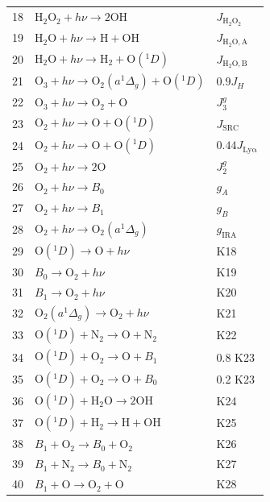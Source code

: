 \begin{longtable}{rp{}p{}}
18 & $\mathrm{H_{2}O_{2}}+h\nu\longrightarrow 2\mathrm{OH}$ & $J_{\mathrm{H_2O_2}}$\\
19 & $\mathrm{H_{2}O}+h\nu\longrightarrow \mathrm{H}+\mathrm{OH}$ & $J_{\mathrm{H_2O,A}}$\\
20 & $\mathrm{H_{2}O}+h\nu\longrightarrow \mathrm{H_{2}}+\mathrm{O}(^1D)$ & $J_{\mathrm{H_2O,B}}$\\
21 & $\mathrm{O_{3}}+h\nu\longrightarrow \mathrm{O}_2(a^1\Delta_g)+\mathrm{O}(^1D)$ & $0.9J_H$\\
22 & $\mathrm{O_{3}}+h\nu\longrightarrow \mathrm{O_{2}}+\mathrm{O}$ & $J_3^g$\\
23 & $\mathrm{O_{2}}+h\nu\longrightarrow \mathrm{O}+\mathrm{O}(^1D)$ & $J_{\mathrm{SRC}}$\\
24 & $\mathrm{O_{2}}+h\nu\longrightarrow \mathrm{O}+\mathrm{O}(^1D)$ & $0.44J_{\mathrm{Ly\alpha}}$\\
25 & $\mathrm{O_{2}}+h\nu\longrightarrow 2\mathrm{O}$ & $J_2^g$\\
26 & $\mathrm{O_{2}}+h\nu\longrightarrow B_0$ & $g_A$\\
27 & $\mathrm{O_{2}}+h\nu\longrightarrow B_1$ & $g_B$\\
28 & $\mathrm{O_{2}}+h\nu\longrightarrow \mathrm{O}_2(a^1\Delta_g)$ & $g_{\mathrm{IRA}}$\\
29 & $\mathrm{O}(^1D)\longrightarrow \mathrm{O}+h\nu$ & K18\\
30 & $B_0\longrightarrow \mathrm{O_{2}}+h\nu$ & K19\\
31 & $B_1\longrightarrow \mathrm{O_{2}}+h\nu$ & K20\\
32 & $\mathrm{O}_2(a^1\Delta_g)\longrightarrow \mathrm{O_{2}}+h\nu$ & K21\\
33 & $\mathrm{O}(^1D)+\mathrm{N_{2}}\longrightarrow \mathrm{O}+\mathrm{N_{2}}$ & K22\\
34 & $\mathrm{O}(^1D)+\mathrm{O_{2}}\longrightarrow \mathrm{O}+B_1$ & 0.8 K23\\
35 & $\mathrm{O}(^1D)+\mathrm{O_{2}}\longrightarrow \mathrm{O}+B_0$ & 0.2 K23\\
36 & $\mathrm{O}(^1D)+\mathrm{H_{2}O}\longrightarrow 2\mathrm{OH}$ & K24\\
37 & $\mathrm{O}(^1D)+\mathrm{H_{2}}\longrightarrow \mathrm{H}+\mathrm{OH}$ & K25\\
38 & $B_1+\mathrm{O_{2}}\longrightarrow B_0+\mathrm{O_{2}}$ & K26\\
39 & $B_1+\mathrm{N_{2}}\longrightarrow B_0+\mathrm{N_{2}}$ & K27\\
40 & $B_1+\mathrm{O}\longrightarrow \mathrm{O_{2}}+\mathrm{O}$ & K28\\

\end{longtable}
